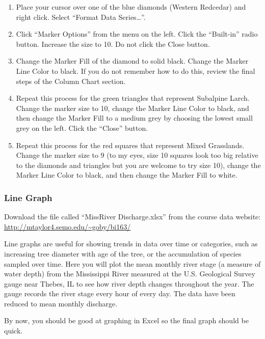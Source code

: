 \documentclass[12pt, hidelinks]{exam}
\newcommand{\VSpace}{\vspace{\baselineskip}}
\begin{document}
\begin{enumerate}
	\item Place your cursor over one of the blue diamonds (Western Redcedar) and right click. Select “Format Data Series\dots”. 

	\item Click “Marker Options” from the menu on the left. Click the “Built-in” radio button. Increase the size to 10. Do not click the Close button.

	\item Change the Marker Fill of the diamond to solid black. Change the Marker Line Color to black. If you do not remember how to do this, review the final steps of the Column Chart section.

	\item Repeat this process for the green triangles that represent Subalpine Larch. Change the marker size to 10, change the Marker Line Color to black, and then change the Marker Fill to a medium grey by choosing the lowest small grey on the left. Click the “Close” button.

	\item Repeat this process for the red squares that represent Mixed Grasslands. Change the marker size to 9 (to my eyes, size 10 squares look too big relative to the diamonds and triangles but you are welcome to try size 10), change the Marker Line Color to black, and then change the Marker Fill to white.
\end{enumerate}

\subsubsection*{Line Graph}

Download the file called “MissRiver Discharge.xlsx” from the course data website: \url{http://mtaylor4.semo.edu/~goby/bi163/}\VSpace

Line graphs are useful for showing trends in data over time or categories, such as increasing tree diameter with age of the tree, or the accumulation of species sampled over time. Here you will plot the mean monthly river stage (a measure of water depth) from the Mississippi River measured at the U.S. Geological Survey gauge near Thebes, IL to see how river depth changes throughout the year. The gauge records the river stage every hour of every day. The data have been reduced to mean monthly discharge.

By now, you should be good at graphing in Excel so the final graph should be quick.
\end{document}
